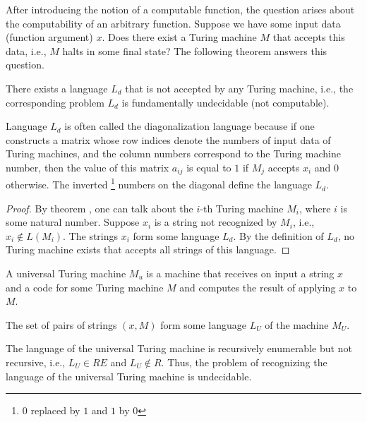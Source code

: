 After introducing the notion of a computable function, the question arises about the computability of an arbitrary function. Suppose we have some input data (function argument) $x$. Does there exist a Turing machine $M$ that accepts this data, i.e., $M$ halts in some final state? The following theorem answers this question.

\begin{theorem}[On Undecidability]
There exists a language $L_d$ that is not accepted by any Turing machine, i.e., the corresponding problem $L_d$ is fundamentally undecidable (not computable).
\label{theoremAddAlgoTuringLdUndecidability}
\end{theorem}

Language $L_d$ is often called the diagonalization language because if one constructs a matrix
\cite{bUllman2006} whose row indices denote the numbers of input data of Turing machines, and the column numbers correspond to the Turing machine number, then the value of this matrix $a_{ij}$ is equal to $1$ if $M_j$ accepts $x_i$ and $0$ otherwise. The inverted \footnote{$0$ replaced by $1$ and $1$ by $0$} numbers on the diagonal define the language $L_d$.

\begin{proof}
By theorem , one can talk about the $i$-th Turing machine $M_i$, where $i$ is some natural number. Suppose $x_i$ is a string not recognized by $M_i$, i.e., 
$x_i \notin L\left(M_i\right)$. The strings $x_i$ form some language $L_d$. By the definition of $L_d$, no Turing machine exists that accepts all strings of this language.
\end{proof}

\begin{definition}
A universal Turing machine $M_u$ is a machine that receives on input a string $x$ and a code for some Turing machine $M$ and computes the result of applying $x$ to $M$.
\end{definition}



The set of pairs of strings $\left(x, M\right)$ form some language $L_U$ of the machine
$M_U$. 



\begin{theorem}

The language of the universal Turing machine is recursively enumerable but not recursive, i.e., $L_U \in RE$ and $L_U \notin R$. Thus, the problem of recognizing the language of the universal Turing machine is undecidable.
\label{theoremAddAlgoTuringUniversalMachine}
\end{theorem}

